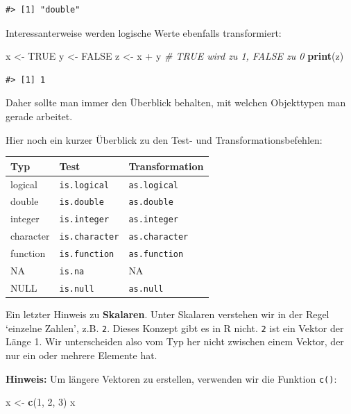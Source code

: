 \documentclass[]{tufte-book}
\newenvironment{Shaded}{}{}
\newcommand{\KeywordTok}[1]{\textcolor[rgb]{0.00,0.44,0.13}{\textbf{#1}}}
\newcommand{\DecValTok}[1]{\textcolor[rgb]{0.25,0.63,0.44}{#1}}
\newcommand{\StringTok}[1]{\textcolor[rgb]{0.25,0.44,0.63}{#1}}
\newcommand{\CommentTok}[1]{\textcolor[rgb]{0.38,0.63,0.69}{\textit{#1}}}
\newcommand{\OtherTok}[1]{\textcolor[rgb]{0.00,0.44,0.13}{#1}}
\newcommand{\OperatorTok}[1]{\textcolor[rgb]{0.40,0.40,0.40}{#1}}
\newcommand{\NormalTok}[1]{#1}
\begin{document}
\begin{verbatim}
#> [1] "double"
\end{verbatim}

Interessanterweise werden logische Werte ebenfalls transformiert:

\begin{Shaded}
\begin{Highlighting}[]
\NormalTok{x <-}\StringTok{ }\OtherTok{TRUE}
\NormalTok{y <-}\StringTok{ }\OtherTok{FALSE}
\NormalTok{z <-}\StringTok{ }\NormalTok{x }\OperatorTok{+}\StringTok{ }\NormalTok{y  }\CommentTok{# TRUE wird zu 1, FALSE zu 0}
\KeywordTok{print}\NormalTok{(z)}
\end{Highlighting}
\end{Shaded}

\begin{verbatim}
#> [1] 1
\end{verbatim}

Daher sollte man immer den Überblick behalten, mit welchen Objekttypen
man gerade arbeitet.

Hier noch ein kurzer Überblick zu den Test- und Transformationsbefehlen:

\begin{longtable}[]{@{}lll@{}}
\toprule
Typ & Test & Transformation\tabularnewline
\midrule
\endhead
logical & \texttt{is.logical} & \texttt{as.logical}\tabularnewline
double & \texttt{is.double} & \texttt{as.double}\tabularnewline
integer & \texttt{is.integer} & \texttt{as.integer}\tabularnewline
character & \texttt{is.character} & \texttt{as.character}\tabularnewline
function & \texttt{is.function} & \texttt{as.function}\tabularnewline
NA & \texttt{is.na} & NA\tabularnewline
NULL & \texttt{is.null} & \texttt{as.null}\tabularnewline
\bottomrule
\end{longtable}

Ein letzter Hinweis zu \textbf{Skalaren}. Unter Skalaren verstehen wir
in der Regel `einzelne Zahlen', z.B. \texttt{2}. Dieses Konzept gibt es
in R nicht. \texttt{2} ist ein Vektor der Länge 1. Wir unterscheiden
also vom Typ her nicht zwischen einem Vektor, der nur ein oder mehrere
Elemente hat.

\textbf{Hinweis:} Um längere Vektoren zu erstellen, verwenden wir die
Funktion \texttt{c()}:

\begin{Shaded}
\begin{Highlighting}[]
\NormalTok{x <-}\StringTok{ }\KeywordTok{c}\NormalTok{(}\DecValTok{1}\NormalTok{, }\DecValTok{2}\NormalTok{, }\DecValTok{3}\NormalTok{)}
\NormalTok{x}
\end{Highlighting}
\end{Shaded}
\end{document}
